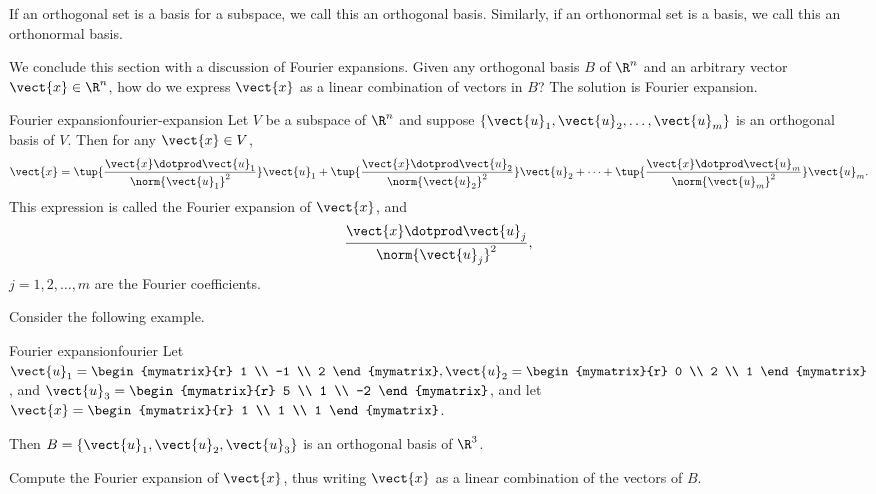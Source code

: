 If an orthogonal set is a basis for a subspace, we call this an
orthogonal basis. Similarly, if an orthonormal set is a basis, we call
this an orthonormal basis.

We conclude this section with a discussion of Fourier expansions. Given any orthogonal basis $B$ of $\R^n$ and an arbitrary vector $\vect{x} \in \R^n$, how do we express $\vect{x}$ as a linear combination of vectors in $B$? The solution is Fourier expansion. 

\begin{theorem}{Fourier expansion}{fourier-expansion}
Let $V$ be a subspace of $\R^n$ and suppose $\{\vect{u}_1, \vect{u}_2, \ldots, \vect{u}_m\}$
is an orthogonal basis of $V$. 
Then for any $\vect{x}\in V$,
\[ \vect{x} = 
\tup{\frac{\vect{x}\dotprod \vect{u}_1}{\norm{\vect{u}_1}^2}} \vect{u}_1 +
\tup{\frac{\vect{x}\dotprod \vect{u}_2}{\norm{\vect{u}_2}^2}} \vect{u}_2 +
\cdots +
\tup{\frac{\vect{x}\dotprod \vect{u}_m}{\norm{\vect{u}_m}^2}} \vect{u}_m.
\]
This expression is called the Fourier expansion 
of $\vect{x}$, and 
\[ \frac{\vect{x}\dotprod \vect{u}_j}{\norm{\vect{u}_j}^2},\]
$j=1,2,\ldots,m$
are the Fourier coefficients.
\end{theorem}

Consider the following example.

\begin{example}{Fourier expansion}{fourier}
Let
$\vect{u}_1= \begin{mymatrix}{r} 1 \\ -1 \\ 2 \end{mymatrix},
\vect{u}_2= \begin{mymatrix}{r} 0 \\ 2 \\ 1  \end{mymatrix}$,
and
$\vect{u}_3 =\begin{mymatrix}{r} 5 \\ 1 \\ -2 \end{mymatrix}$, 
and let 
$\vect{x} =\begin{mymatrix}{r} 1 \\ 1 \\ 1 \end{mymatrix}$.

Then $B=\{\vect{u}_1, \vect{u}_2, \vect{u}_3\}$
is an orthogonal basis of $\R^3$. 

Compute the Fourier expansion of $\vect{x}$, thus writing $\vect{x}$ as  a linear combination of the vectors of $B$. 
\end{example}

